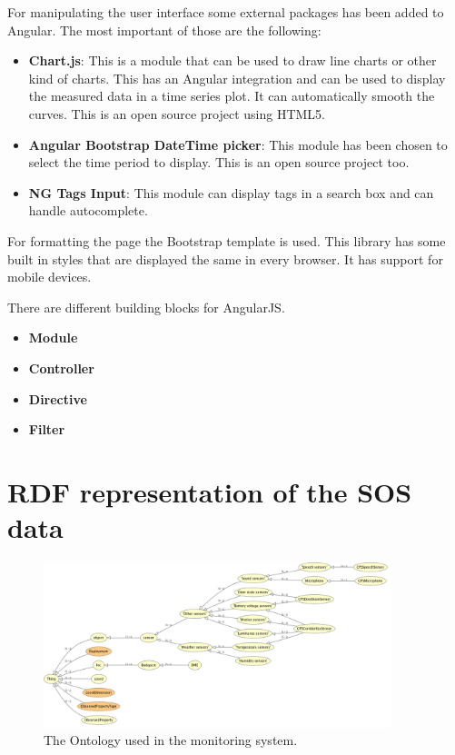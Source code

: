 For manipulating the user interface some external packages has been added to Angular. The most important of those are the following:
\begin{itemize}
\item \textbf{Chart.js}: This is a module that can be used to draw line charts or other kind of charts. This has an Angular integration and can be used to display the measured data in a time series plot. It can automatically smooth the curves. This is an open source project using HTML5.
\item \textbf{Angular Bootstrap DateTime picker}: This module has been chosen to select the time period to display. This is an open source project too.
\item \textbf{NG Tags Input}: This module can display tags in a search box and can handle autocomplete. 
\end{itemize}

For formatting the page the Bootstrap template is used. 
This library has some built in styles that are displayed the same in every browser. It has support for mobile devices.

There are different building blocks for AngularJS. 
\begin{itemize}
\item \textbf{Module}
\item \textbf{Controller}
\item \textbf{Directive}
\item \textbf{Filter}
\end{itemize}

\section{RDF representation of the SOS data}

\begin{figure}[h]
\centering
\includegraphics[width=0.9\textwidth]{figures/implrdf.png}
\caption{The Ontology used in the monitoring system.\label{fig:implrdf}}
\end{figure}

